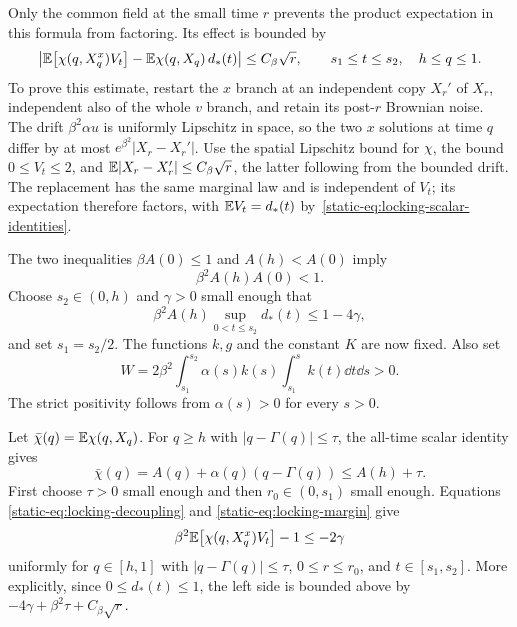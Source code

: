 Only the common field at the small time $r$ prevents the product
expectation in this formula from factoring. Its effect is bounded by
\begin{equation}
\label{static-eq:locking-decoupling}
 \left|\mathbb E\bigl[\chi(q,X_q^x)V_t\bigr]
       -\mathbb E\chi(q,X_q)\,d_*(t)\right|
 \leq C_\beta\sqrt r,
 \qquad s_1\leq t\leq s_2,\quad h\leq q\leq1.
\end{equation}
To prove this estimate, restart the $x$ branch at an independent copy
$X_r'$ of $X_r$, independent also of the whole $v$ branch, and retain
its post-$r$ Brownian noise. The drift $\beta^2\alpha u$ is uniformly
Lipschitz in space, so the two $x$ solutions at time $q$ differ by at
most $e^{\beta^2}|X_r-X_r'|$. Use the spatial Lipschitz bound for
$\chi$, the bound $0\leq V_t\leq2$, and
$\mathbb E|X_r-X_r'|\leq C_\beta\sqrt r$, the latter following from the
bounded drift. The replacement has the same marginal law and is
independent of $V_t$; its expectation therefore factors, with
$\mathbb E V_t=d_*(t)$ by~\eqref{static-eq:locking-scalar-identities}.

The two inequalities $\beta A(0)\leq1$ and $A(h)<A(0)$ imply
\[
 \beta^2 A(h)A(0)<1.
\]
Choose $s_2\in(0,h)$ and $\gamma>0$ small enough that
\begin{equation}
\label{static-eq:locking-margin}
 \beta^2A(h)\sup_{0<t\leq s_2}d_*(t)\leq1-4\gamma,
\end{equation}
and set $s_1=s_2/2$. The functions $k,g$ and the constant $K$ are now
fixed. Also set
\[
 W=2\beta^2\int_{s_1}^{s_2}\alpha(s)k(s)
                    \int_{s_1}^{s}k(t)\dd t\dd s>0.
\]
The strict positivity follows from $\alpha(s)>0$ for every $s>0$.

Let $\bar\chi(q)=\mathbb E\chi(q,X_q)$. For $q\geq h$ with
$|q-\Gamma(q)|\leq\tau$, the all-time scalar identity gives
\[
 \bar\chi(q)=A(q)+\alpha(q)(q-\Gamma(q))\leq A(h)+\tau.
\]
First choose $\tau>0$ small enough and then
$r_0\in(0,s_1)$ small enough. Equations
\eqref{static-eq:locking-decoupling} and
\eqref{static-eq:locking-margin} give
\begin{equation}
\label{static-eq:locking-negative-factor}
 \beta^2\mathbb E\bigl[\chi(q,X_q^x)V_t\bigr]-1\leq-2\gamma
\end{equation}
uniformly for $q\in[h,1]$ with $|q-\Gamma(q)|\leq\tau$,
$0\leq r\leq r_0$, and $t\in[s_1,s_2]$. More explicitly, since
$0\leq d_*(t)\leq1$, the left side is bounded above by
$-4\gamma+\beta^2\tau+C_\beta\sqrt r$.

